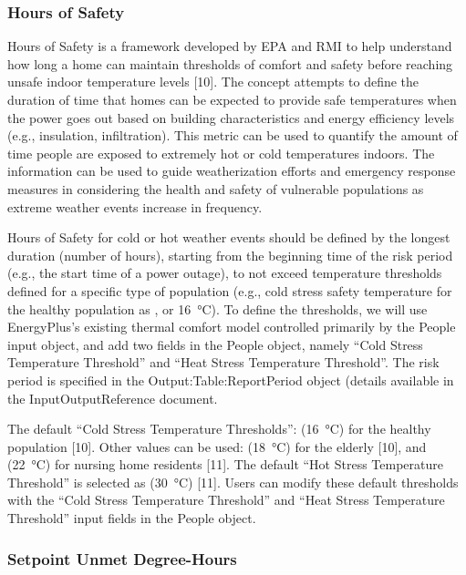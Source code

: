 \subsubsection{Hours of Safety}\label{hours-of-safety}

Hours of Safety is a framework developed by EPA and RMI to help understand how
long a home can maintain thresholds of comfort and safety before reaching unsafe
indoor temperature levels [10]. The concept attempts to define the duration of
time that homes can be expected to provide safe temperatures when the power goes
out based on building characteristics and energy efficiency levels (e.g.,
insulation, infiltration). This metric can be used to quantify the amount of
time people are exposed to extremely hot or cold temperatures indoors. The
information can be used to guide weatherization efforts and emergency response
measures in considering the health and safety of vulnerable populations as
extreme weather events increase in frequency.

Hours of Safety for cold or hot weather events should be defined by the longest
duration (number of hours), starting from the beginning time of the risk period
(e.g., the start time of a power outage), to not exceed temperature thresholds
defined for a specific type of population (e.g., cold stress safety temperature
for the healthy population as , or \SI{16}{\celsius}). To define the
thresholds, we will use EnergyPlus's existing thermal comfort model controlled
primarily by the People input object, and add two fields in the People object,
namely ``Cold Stress Temperature Threshold'' and ``Heat Stress Temperature
Threshold''. The risk period is specified in the Output:Table:ReportPeriod object (details available in the InputOutputReference document.

The default ``Cold Stress Temperature Thresholds'':  (\SI{16}{\celsius})
for the healthy population [10]. Other values can be used: 
(\SI{18}{\celsius}) for the elderly [10], and  (\SI{22}{\celsius}) for nursing
home residents [11]. The default ``Hot Stress Temperature Threshold'' is
selected as  (\SI{30}{\celsius}) [11]. Users can modify these default
thresholds with the ``Cold Stress Temperature Threshold'' and ``Heat Stress
Temperature Threshold'' input fields in the People object.

\subsubsection{Setpoint Unmet Degree-Hours}\label{unmet-degree-hours}

